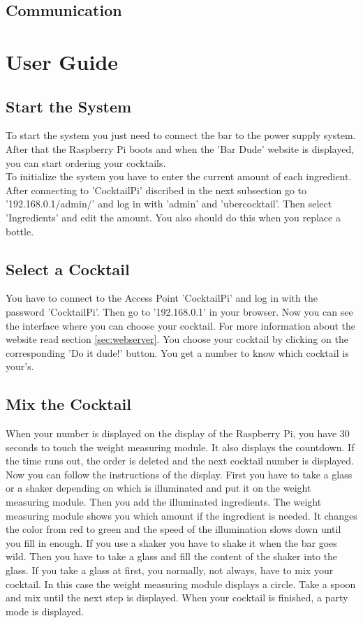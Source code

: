 \documentclass{acm_proc_article-sp}
\begin{document}
\subsection{Communication}
\section{User Guide}
\subsection{Start the System}
To start the system you just need to connect the bar to the power supply system. After that the Raspberry Pi boots and when the 'Bar Dude' website is displayed, you can start ordering your cocktails. \\
To initialize the system you have to enter the current amount of each ingredient. After connecting to 'CocktailPi' discribed in the next subsection go to '192.168.0.1/admin/' and log in with 'admin' and 'ubercocktail'. Then select 'Ingredients' and edit the amount. You also should do this when you replace a bottle.
 \subsection{Select a Cocktail}
You have to connect to the Access Point 'CocktailPi' and log in with the password 'CocktailPi'. Then go to '192.168.0.1' in your browser. Now you can see the interface where you can choose your cocktail. For more information about the website read section \ref{sec:webserver}. You choose your cocktail by clicking on the corresponding 'Do it dude!' button. You get a number to know which cocktail is your's.
 \subsection{Mix the Cocktail}
When your number is displayed on the display of the Raspberry Pi, you have 30 seconds to touch the weight measuring module. It also displays the countdown. If the time runs out, the order is deleted and the next cocktail number is displayed. \\
Now you can follow the instructions of the display. First you have to take a glass or a shaker depending on which is illuminated and put it on the weight measuring module. Then you add the illuminated ingredients. The weight measuring module shows you which amount if the ingredient is needed. It changes the color from red to green and the speed of the illumination slows down until you fill in enough. If you use a shaker you have to shake it when the bar goes wild. Then you have to take a glass and fill the content of the shaker into the glass. If you take a glass at first, you normally, not always, have to mix your cocktail. In this case the weight measuring module displays a circle. Take a spoon and mix until the next step is displayed. When your cocktail is finished, a party mode is displayed. 
\end{document}
